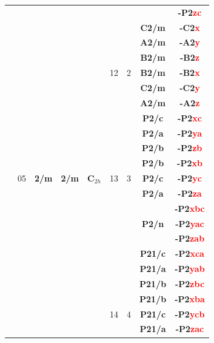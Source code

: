 \documentclass{article}      %
\begin{document}
\begin{small}
\begin{longtable}[c]{|c|c|c|c|c|c|c|c|c|}
 & & & & & & & &\textbf{-P2\textcolor{red}{zc}}  \\\cline{6-9}
 & & & & & & &\textbf{C2/m} &\textbf{-C2\textcolor{red}{x}}  \\\cline{8-9}
 & & & & & & &\textbf{A2/m} &\textbf{-A2\textcolor{red}{y}}  \\\cline{8-9}
 & & & & & & &\textbf{B2/m} &\textbf{-B2\textcolor{red}{z}}  \\\cline{8-9}
 & & & & &\textrm{12} &2&\textbf{B2/m} &\textbf{-B2\textcolor{red}{x}}  \\\cline{8-9}
 & & & & & & &\textbf{C2/m} &\textbf{-C2\textcolor{red}{y}}  \\\cline{8-9}
 & & & & & & &\textbf{A2/m} &\textbf{-A2\textcolor{red}{z}}  \\\cline{6-9}
 & & & & & & &\textbf{P2/c} &\textbf{-P2\textcolor{red}{xc}}  \\\cline{8-9}
 & & & & & & &\textbf{P2/a} &\textbf{-P2\textcolor{red}{ya}}  \\\cline{8-9}
 & & & & & & &\textbf{P2/b} &\textbf{-P2\textcolor{red}{zb}}  \\\cline{8-9}
 & & & & & & &\textbf{P2/b} &\textbf{-P2\textcolor{red}{xb}}  \\\cline{8-9}
 & \textrm{05} &\textbf{2/m} &\textbf{2/m} &$\mathbf{C}_{2h}$ &\textrm{13} &3 &\textbf{P2/c}&\textbf{-P2\textcolor{red}{yc}} \\\cline{8-9}
 & & & & & & &\textbf{P2/a} &\textbf{-P2\textcolor{red}{za}}  \\\cline{8-9}
 & & & & & & & &\textbf{-P2\textcolor{red}{xbc}}  \\\cline{9-9}
 & & & & & & &\textbf{P2/n} &\textbf{-P2\textcolor{red}{yac}}  \\\cline{9-9}
 & & & & & & & &\textbf{-P2\textcolor{red}{zab}}  \\\cline{6-9}
 & & & & & & &\textbf{P21/c} &\textbf{-P2\textcolor{red}{xca}}  \\\cline{8-9}
 & & & & & & &\textbf{P21/a} &\textbf{-P2\textcolor{red}{yab}}  \\\cline{8-9}
 & & & & & & &\textbf{P21/b} &\textbf{-P2\textcolor{red}{zbc}}  \\\cline{8-9}
 & & & & & & &\textbf{P21/b} &\textbf{-P2\textcolor{red}{xba}}  \\\cline{8-9}
 & & & & &\textrm{14} &4 &\textbf{P21/c}&\textbf{-P2\textcolor{red}{ycb}} \\\cline{8-9}
 & & & & & & &\textbf{P21/a} &\textbf{-P2\textcolor{red}{zac}}  \\\cline{8-9}

\end{longtable}
\end{small}
\end{document}
